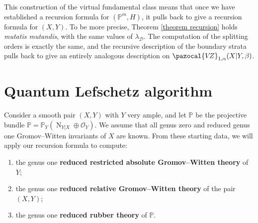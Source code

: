 \documentclass[11pt]{amsart}
\newcommand{\PP}{\mathbb P}
\newcommand{\VZ}{\pazocal{V\!Z}}
\newcommand{\OO}{\mathcal{O}}
\newcommand{\Dcal}{\mathcal{D}}
\theoremstyle{definition}
\theoremstyle{definition}
\begin{document}
This construction of the virtual fundamental class means that once we have established a recursion formula for $(\PP^m,H)$, it pulls back to give a recursion formula for $(X,Y)$. To be more precise, Theorem \ref{theorem recursion} holds \emph{mutatis mutandis}, with the same values of $\lambda_\Dcal$. The computation of the splitting orders is exactly the same, and the recursive description of the boundary strata pulls back to give an entirely analogous description on $\VZ_{1,\alpha}(X|Y,\beta)$.


\section{Quantum Lefschetz algorithm}\label{section recursion algorithm}
\noindent Consider a smooth pair $(X,Y)$ with $Y$ very ample, and let $\mathbb{P}$ be the projective bundle $\mathbb{P}=\PP_Y(\operatorname{N}_{Y|X} \oplus\OO_Y)$. We assume that all genus zero and reduced genus one Gromov--Witten invariants of $X$ are known. From these starting data, we will apply our recursion formula to compute:
\begin{enumerate}
\item the genus one \textbf{reduced restricted absolute Gromov--Witten theory} of $Y$;
\item the genus one \textbf{reduced relative Gromov--Witten theory} of the pair $(X,Y)$;
\item the genus one \textbf{reduced rubber theory} of $\mathbb{P}$.
\end{enumerate}
\end{document}
